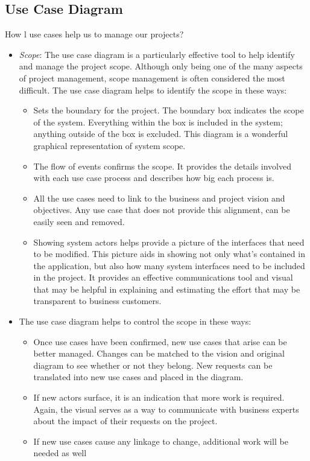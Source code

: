 \documentclass[12pt, a4paper]{article}
\begin{document}
\subsection{Use Case Diagram}
How l use cases help us to manage our  projects?
\begin{itemize}
\item \textit{Scope}: The use case diagram is a particularly effective tool to help identify and manage the project scope. Although only being one of the many aspects of project management, scope management is often considered the most difficult. The use case diagram helps to identify the scope in these ways:
   \begin{itemize}
     \item Sets the boundary for the project. The boundary box indicates the scope of the system. Everything within the box is included in the system; anything outside of the box is excluded. This diagram is a wonderful graphical representation of system scope.
     \item The flow of events confirms the scope. It provides the details involved with each use case process and describes how big each process is.
     \item All the use cases need to link to the business and project vision and objectives. Any use case that does not provide this alignment, can be easily seen and removed.
     \item Showing system actors helps provide a picture of the interfaces that need to be modified. This picture aids in showing not only what's contained in the application, but also how many system interfaces need to be included in the project. It provides an effective communications tool and visual that may be helpful in explaining and estimating the effort that may be transparent to business customers.
   \end{itemize}
\item The use case diagram helps to control the scope in these ways:
   \begin{itemize}
     \item Once use cases have been confirmed, new use cases that arise can be better managed. Changes can be matched to the vision and original diagram to see whether or not they belong. New requests can be translated into new use cases and placed in the diagram.
     \item If new actors surface, it is an indication that more work is required. Again, the visual serves as a way to communicate with business experts about the impact of their requests on the project.
     \item If new use cases cause any linkage to change, additional work will be needed as well
   \end{itemize}
\end{itemize}
\end{document}
